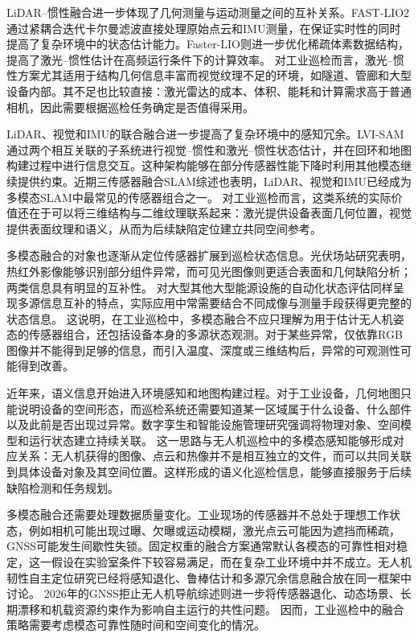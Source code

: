 LiDAR--惯性融合进一步体现了几何测量与运动测量之间的互补关系。FAST-LIO2通过紧耦合迭代卡尔曼滤波直接处理原始点云和IMU测量，在保证实时性的同时提高了复杂环境中的状态估计能力\cite{Xu2022FASTLIO2}。Faster-LIO则进一步优化稀疏体素数据结构，提高了激光--惯性估计在高频运行条件下的计算效率\cite{Bai2022FasterLIO}。 对工业巡检而言，激光--惯性方案尤其适用于结构几何信息丰富而视觉纹理不足的环境，如隧道、管廊和大型设备内部。其不足也比较直接：激光雷达的成本、体积、能耗和计算需求高于普通相机，因此需要根据巡检任务确定是否值得采用。

LiDAR、视觉和IMU的联合融合进一步提高了复杂环境中的感知冗余。LVI-SAM通过两个相互关联的子系统进行视觉--惯性和激光--惯性状态估计，并在回环和地图构建过程中进行信息交互\cite{Shan2021LVISAM}。这种架构能够在部分传感器性能下降时利用其他模态继续提供约束。近期三传感器融合SLAM综述也表明，LiDAR、视觉和IMU已经成为多模态SLAM中最常见的传感器组合之一\cite{Fan2025FusionSLAM}。 对工业巡检而言，这类系统的实际价值还在于可以将三维结构与二维纹理联系起来：激光提供设备表面几何位置，视觉提供表面纹理和语义，从而为后续缺陷定位建立共同空间参考。

多模态融合的对象也逐渐从定位传感器扩展到巡检状态信息。光伏场站研究表明，热红外影像能够识别部分组件异常，而可见光图像则更适合表面和几何缺陷分析；两类信息具有明显的互补性\cite{Yahya2022PVReview,Ramirez2022PVRTK,oliveira2023pvairt,zefri2023pvlwir,li2024multispectraldefect}。 对大型其他大型能源设施的自动化状态评估同样呈现多源信息互补的特点，实际应用中常需要结合不同成像与测量手段获得更完整的状态信息。 这说明，在工业巡检中，多模态融合不应只理解为用于估计无人机姿态的传感器组合，还包括设备本身的多源状态观测。对于某些异常，仅依靠RGB图像并不能得到足够的信息，而引入温度、深度或三维结构后，异常的可观测性可能得到改善。

近年来，语义信息开始进入环境感知和地图构建过程。对于工业设备，几何地图只能说明设备的空间形态，而巡检系统还需要知道某一区域属于什么设备、什么部件以及此前是否出现过异常。数字孪生和智能设施管理研究强调将物理对象、空间模型和运行状态建立持续关联\cite{Tao2019DigitalTwin}。 这一思路与无人机巡检中的多模态感知能够形成对应关系：无人机获得的图像、点云和热像并不是相互独立的文件，而可以共同关联到具体设备对象及其空间位置。这样形成的语义化巡检信息，能够直接服务于后续缺陷检测和任务规划。

多模态融合还需要处理数据质量变化。工业现场的传感器并不总处于理想工作状态，例如相机可能出现过曝、欠曝或运动模糊，激光点云可能因为遮挡而稀疏，GNSS可能发生间歇性失锁。固定权重的融合方案通常默认各模态的可靠性相对稳定，这一假设在实验室条件下较容易满足，而在复杂工业环境中并不成立。无人机韧性自主定位研究已经将感知退化、鲁棒估计和多源冗余信息融合放在同一框架中讨论\cite{Zhao2024ResilientUAV,zhao2025resilient,jarraya2025gnssdenied}。 2026年的GNSS拒止无人机导航综述则进一步将传感器退化、动态场景、长期漂移和机载资源约束作为影响自主运行的共性问题\cite{Alqudsi2026GNSSDenied}。 因而，工业巡检中的融合策略需要考虑模态可靠性随时间和空间变化的情况。

